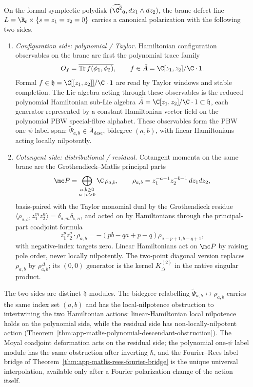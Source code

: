\begin{thm}
\label{thm:app-defect-polarization}
  On the formal symplectic polydisk \((\widehat{\C^2}_0,dz_1\wedge dz_2)\),
  the brane defect line \(L=\R_t\times\{s=z_1=z_2=0\}\) carries a
  canonical polarization with the following two sides.
  \begin{enumerate}
    \item \emph{Configuration side: polynomial / Taylor.}  Hamiltonian
      configuration observables on the brane are first the polynomial trace
      family
      \[
        O_f=\overline{\operatorname{Tr}f(\phi_1,\phi_2)},\qquad
        f\in\bar A=\C[z_1,z_2]/\C\cdot1 .
      \]
      Formal \(f\in\mathfrak h=\C[[z_1,z_2]]/\C\cdot1\) are read by
      Taylor windows and stable completion.
      The Lie algebra acting through these observables is the reduced
      polynomial Hamiltonian sub-Lie algebra
      \(\bar A=\C[z_1,z_2]/\C\cdot1\subset\mathfrak h\), each generator
      represented by a constant Hamiltonian vector field on the
      polynomial PBW special-fibre alphabet.  These observables form the
      PBW one-\(\psi\) label span:
      \(\widetilde\Psi_{a,b}\in\bar A_{\mathrm{desc}}\), bidegree
      \((a,b)\), with linear Hamiltonians acting locally nilpotently.
    \item \emph{Cotangent side: distributional / residual.}  Cotangent
      momenta on the same brane are the Grothendieck--Matlis principal
      parts
      \[
        \mc P=\bigoplus_{\substack{a,b\geq0\\a+b>0}}\C\,\rho_{a,b},
        \qquad
        \rho_{a,b}=z_1^{-a-1}z_2^{-b-1}\,dz_1dz_2,
      \]
      basis-paired with the Taylor monomial dual by the Grothendieck
      residue
      \(\langle\rho_{a,b},z_1^m z_2^n\rangle=\delta_{a,m}\delta_{b,n}\),
      and acted on by Hamiltonians through the principal-part coadjoint
      formula
      \[
        z_1^p z_2^q\cdot\rho_{a,b}
          =-(pb-qa+p-q)\rho_{a-p+1,b-q+1},
      \]
      with negative-index targets zero.  Linear Hamiltonians act on
      \(\mc P\) by raising pole order, never locally nilpotently.
      The two-point diagonal version replaces \(\rho_{a,b}\) by
      \(\rho^\Delta_{a,b}\); its \((0,0)\) generator is the kernel
      \(K^{(2)}_\Delta\) in the native singular product.
  \end{enumerate}
  The two sides are distinct \(\mathfrak h\)-modules.  The
  bidegree relabelling
  \(\widetilde\Psi_{a,b}\leftrightarrow\rho_{a,b}\) carries the same
  index set \((a,b)\) and has the local-nilpotence obstruction to
  intertwining the two Hamiltonian actions: linear-Hamiltonian local
  nilpotence holds on the polynomial side, while the residual side has
  non-locally-nilpotent action
  (Theorem~\ref{thm:app-matlis-polynomial-descendant-obstruction}).  The
  Moyal coadjoint deformation acts on the residual side; the polynomial
  one-\(\psi\) label module has the same obstruction after inverting
  \(\hbar\), and the Fourier--Rees label bridge of
  Theorem~\ref{thm:app-matlis-rees-fourier-bridge} is the unique
  universal interpolation, available only after a Fourier polarization
  change of the action itself.


\end{thm}
